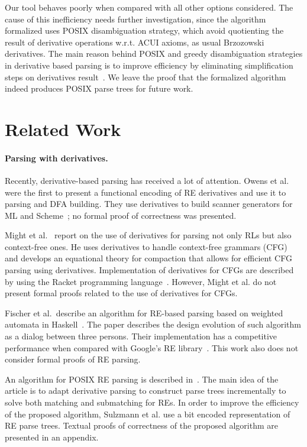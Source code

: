 \documentclass[sigplan, anonymous, review]{acmart}
\theoremstyle{definition}
\begin{document}
Our tool behaves poorly when compared with all other options
considered. The cause of this inefficiency needs further
investigation, since the algorithm formalized uses POSIX 
disambiguation strategy, which avoid quotienting the result of derivative
operations w.r.t. ACUI axioms, as usual Brzozowski derivatives. 
The main reason behind POSIX and greedy disambiguation strategies in 
derivative based parsing is to improve efficiency by eliminating 
simplification steps on derivatives result~\cite{SulzmannL14}. We leave 
the proof that the formalized algorithm indeed produces POSIX parse trees 
for future work.

\section{Related Work}\label{sec:related}

\paragraph{Parsing with derivatives.} Recently, derivative-based
parsing has received a lot of attention. Owens et al. were the first
to present a functional encoding of RE derivatives and use it to
parsing and DFA building. They use derivatives to build scanner
generators for ML and Scheme~\cite{Owens2009}; no formal proof of
correctness was presented.

Might et al.~\cite{Might2011} report on
the use of derivatives for parsing not only RLs but also context-free
ones. He uses derivatives to handle context-free grammars (CFG) and
develops an equational theory for compaction that allows for efficient
CFG parsing using derivatives. Implementation of derivatives for CFGs
are described by using the Racket programming
language~\cite{Felleisen2013}. However, Might et al. do not present
formal proofs related to the use of derivatives for CFGs.

Fischer et al.~describe an algorithm for RE-based parsing based on
weighted automata in Haskell~\cite{Fischer2010}.  The paper describes
the design evolution of such algorithm as a dialog between three
persons. Their implementation has a competitive performance when
compared with Google's RE library~\cite{re2}. This work also does not
consider formal proofs of RE parsing.

An algorithm for POSIX RE parsing is described
in~\cite{SulzmannL14}. The main idea of the article is to adapt
derivative parsing to construct parse trees incrementally to solve
both matching and submatching for REs. In order to improve the
efficiency of the proposed algorithm, Sulzmann et al. use a bit
encoded representation of RE parse trees. Textual proofs of
correctness of the proposed algorithm are presented in an appendix.
\end{document}
